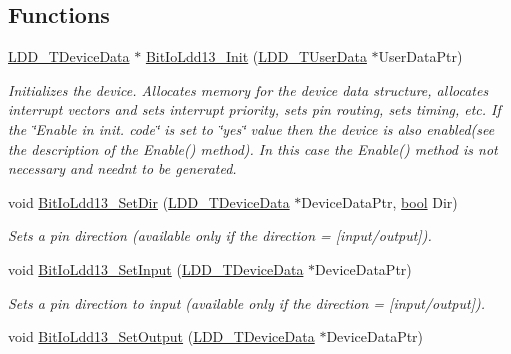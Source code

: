 \subsection*{Functions}
\begin{DoxyCompactItemize}
\item 
\hyperlink{group___p_e___types__module_gac5cf1362f1f0e3a2ce71b1bf2276d091}{L\+D\+D\+\_\+\+T\+Device\+Data} $\ast$ \hyperlink{group___bit_io_ldd13__module_gab5711f568b658b5736ddc29999cf938b}{Bit\+Io\+Ldd13\+\_\+\+Init} (\hyperlink{group___p_e___types__module_ga0b66a73f87238a782318aa0be7578e35}{L\+D\+D\+\_\+\+T\+User\+Data} $\ast$User\+Data\+Ptr)
\begin{DoxyCompactList}\small\item\em Initializes the device. Allocates memory for the device data structure, allocates interrupt vectors and sets interrupt priority, sets pin routing, sets timing, etc. If the \char`\"{}\+Enable
    in init. code\char`\"{} is set to \char`\"{}yes\char`\"{} value then the device is also enabled(see the description of the Enable() method). In this case the Enable() method is not necessary and needn\textquotesingle{}t to be generated. \end{DoxyCompactList}\item 
void \hyperlink{group___bit_io_ldd13__module_gaa510bc6987ce93bf7a866b1766f1a382}{Bit\+Io\+Ldd13\+\_\+\+Set\+Dir} (\hyperlink{group___p_e___types__module_gac5cf1362f1f0e3a2ce71b1bf2276d091}{L\+D\+D\+\_\+\+T\+Device\+Data} $\ast$Device\+Data\+Ptr, \hyperlink{group___p_e___types__module_ga97a80ca1602ebf2303258971a2c938e2}{bool} Dir)
\begin{DoxyCompactList}\small\item\em Sets a pin direction (available only if the direction = {\itshape \mbox{[}input/output\mbox{]}}). \end{DoxyCompactList}\item 
void \hyperlink{group___bit_io_ldd13__module_gac89f06fe1f95f685923b6f13ab290526}{Bit\+Io\+Ldd13\+\_\+\+Set\+Input} (\hyperlink{group___p_e___types__module_gac5cf1362f1f0e3a2ce71b1bf2276d091}{L\+D\+D\+\_\+\+T\+Device\+Data} $\ast$Device\+Data\+Ptr)
\begin{DoxyCompactList}\small\item\em Sets a pin direction to input (available only if the direction = {\itshape \mbox{[}input/output\mbox{]}}). \end{DoxyCompactList}\item 
void \hyperlink{group___bit_io_ldd13__module_ga093dde10b8ace24f9342126bad933a77}{Bit\+Io\+Ldd13\+\_\+\+Set\+Output} (\hyperlink{group___p_e___types__module_gac5cf1362f1f0e3a2ce71b1bf2276d091}{L\+D\+D\+\_\+\+T\+Device\+Data} $\ast$Device\+Data\+Ptr)

\end{DoxyCompactItemize}
